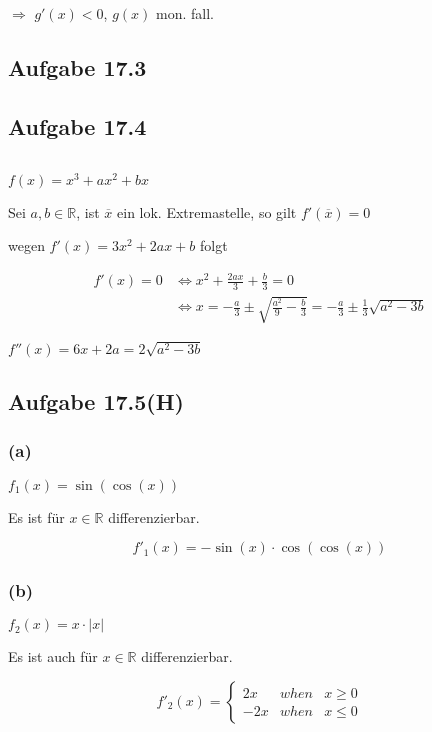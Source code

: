 $\Rightarrow$ $g'(x)<0$, $g(x)$ mon. fall.

\newpage

\subsection{Aufgabe 17.3}

\subsection{Aufgabe 17.4}
$ $\newline

$f(x)=x^3+ax^2+bx$

Sei $a,b\in\mathbb{R}$, ist $\overline{x}$ ein lok. Extremastelle, so gilt $f'(\overline{x})=0$

wegen $f'(x)=3x^2+2ax+b$ folgt

\begin{align*}
f'(x)=0&\Leftrightarrow x^2+\frac{2ax}{3}+\frac{b}{3}=0\\
&\Leftrightarrow x=-\frac{a}{3}\pm\sqrt{\frac{a^2}{9}-\frac{b}{3}}=-\frac{a}{3}\pm\frac{1}{3}\sqrt{a^2-3b}
\end{align*}

$f''(x)=6x+2a=2\sqrt{a^2-3b}$

\newpage

\subsection{Aufgabe 17.5(H)}

\subsubsection{(a)}

$f_1(x)=\sin(\cos(x))$

Es ist für $x\in\mathbb{R}$ differenzierbar.

\begin{equation*}
f'_1(x)=-\sin(x)\cdot\cos(\cos(x))
\end{equation*}

\subsubsection{(b)}

$f_2(x)=x\cdot|x|$

Es ist auch für $x\in\mathbb{R}$ differenzierbar.

\begin{equation*}
f'_2(x)=
\left\{
\begin{array}{rcl}
2x & when & x\geq 0\\
-2x & when & x\leq 0
\end{array}
\right.
\end{equation*}

